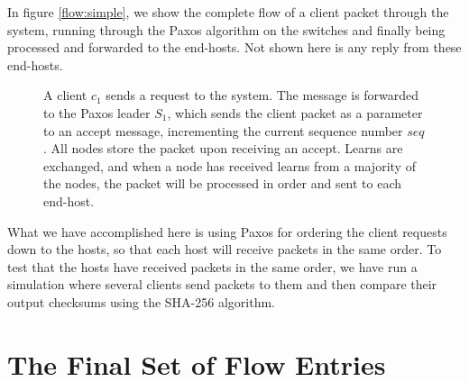 In figure \vref{flow:simple}, we show the complete flow of
a client packet through the system, running through the Paxos algorithm on
the switches and finally being processed and forwarded to the end-hosts.
Not shown here is any reply from these end-hosts.

\begin{figure}
  \centering
  \scriptsize
  \caption{A client $c_1$ sends a request to the system. The message is
    forwarded to the Paxos leader $S_1$, which sends the client packet as a
      parameter to an accept message, incrementing the current sequence
      number $seq$.  All nodes store the packet upon receiving an accept.
      Learns are exchanged, and when a node has received learns from a
      majority of the nodes, the packet will be processed in order and sent
      to each end-host.}
  \label{flow:simple}
\end{figure}

What we have accomplished here is using Paxos for
ordering the client
requests down to the hosts, so that each host will receive packets in the
same order.  To test that the hosts have received packets in the same order,
we have run a simulation where several clients send packets to them and then
compare their output checksums using the SHA-256 algorithm.

\section{The Final Set of Flow Entries}
\label{chapter:final.flowtable}

